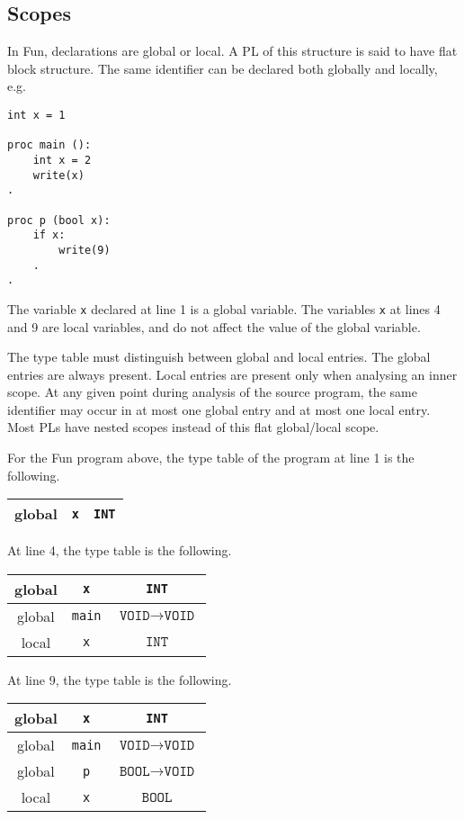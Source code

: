 \documentclass[a4paper, openany]{memoir}
\begin{document}
\subsection{Scopes}
In Fun, declarations are global or local. A PL of this structure is said to have flat block structure. The same identifier can be declared both globally and locally, e.g.
\begin{lstlisting}[language=fun]
int x = 1

proc main ():
    int x = 2
    write(x)
.

proc p (bool x):
    if x:
        write(9)
    .
.
\end{lstlisting}
The variable \texttt{x} declared at line 1 is a global variable. The variables \texttt{x} at lines 4 and 9 are local variables, and do not affect the value of the global variable.

The type table must distinguish between global and local entries. The global entries are always present. Local entries are present only when analysing an inner scope. At any given point during analysis of the source program, the same identifier may occur in at most one global entry and at most one local entry. Most PLs have nested scopes instead of this flat global/local scope.

For the Fun program above, the type table of the program at line 1 is the following.
\begin{table}[H]
    \centering
    \begin{tabular}{|c|c|c|}
        \hline
        global & \texttt{x} & \texttt{INT} \\
        \hline
    \end{tabular}
\end{table}
\noindent At line 4, the type table is the following.
\begin{table}[H]
    \centering
    \begin{tabular}{|c|c|c|}
        \hline
        global & \texttt{x} & \texttt{INT} \\
        \hline
        global & \texttt{main} & $\texttt{VOID} \to \texttt{VOID}$ \\
        \hline
        local & \texttt{x} & $\texttt{INT}$ \\
        \hline
    \end{tabular}
\end{table}
\noindent At line 9, the type table is the following.
\begin{table}[H]
    \centering
    \begin{tabular}{|c|c|c|}
        \hline
        global & \texttt{x} & \texttt{INT} \\
        \hline
        global & \texttt{main} & $\texttt{VOID} \to \texttt{VOID}$ \\
        \hline
        global & \texttt{p} & $\texttt{BOOL} \to \texttt{VOID}$ \\
        \hline
        local & \texttt{x} & $\texttt{BOOL}$ \\
        \hline
    \end{tabular}
\end{table}
\end{document}
